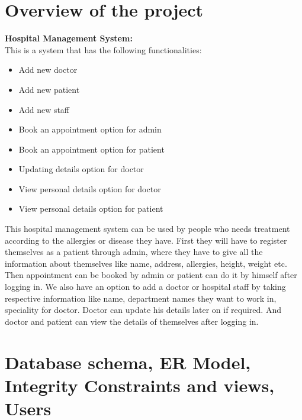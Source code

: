 \documentclass[12pt]{article}
\begin{document}
\begin{titlingpage}
\maketitle
\end{titlingpage}

\newpage
\section{Overview of the project}

\textbf{Hospital Management System:}
\vspace{5mm} \\

This is a system that has the following functionalities:

\begin{itemize}
    \item Add new doctor
    \item Add new patient
    \item Add new staff
    \item Book an appointment option for admin
    \item Book an appointment option for patient
    \item Updating details option for doctor
    \item View personal details option for doctor
    \item View personal details option for patient
\end{itemize}

This hospital management system can be used by people who needs treatment according to the allergies or disease they have. First they will have to register themselves as a patient through admin, where they have to give all the information about themselves like name, address, allergies, height, weight etc. Then appointment can be booked by admin or patient can do it by himself after logging in.
We also have an option to add a doctor or hospital staff by taking respective information like name, department names they want to work in, speciality for doctor. Doctor can update his details later on if required. And doctor and patient can view the details of themselves after logging in.

\newpage

\section{Database schema, ER Model, Integrity Constraints and views,
Users}
\end{document}
